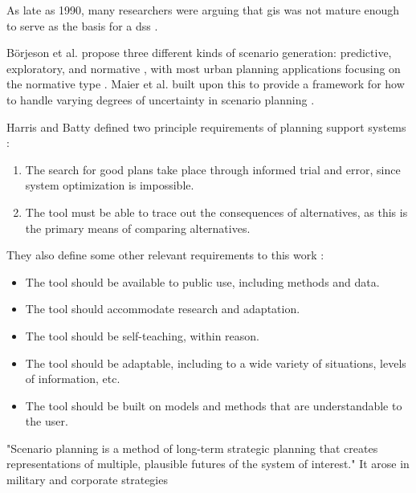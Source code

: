 As late as 1990, many researchers were arguing that \ac{gis} was not mature enough to serve as the basis for a \ac{dss} \cite{jankowskiIntegratingGeographicalInformation1995}.

Börjeson et al. propose three different kinds of scenario generation: predictive, exploratory, and normative \cite{borjesonScenarioTypesTechniques2006}, with most urban planning applications focusing on the normative type \cite{avinUsingExploratoryScenarios2020}. Maier et al. built upon this to provide a framework for how to handle varying degrees of uncertainty in scenario planning \cite{maierUncertainFutureDeep2016}. 


Harris and Batty defined two principle requirements of planning support systems \cite{harrisLocationalModelsGeographic1993}:
\begin{enumerate}[itemsep=0pt,parsep=0pt]
	\item{The search for good plans take place through informed trial and error, since system optimization is impossible.}
	\item{The tool must be able to trace out the consequences of alternatives, as this is the primary means of comparing alternatives.}
\end{enumerate}

They also define some other relevant requirements to this work \cite{harrisLocationalModelsGeographic1993}:
\begin{itemize}[itemsep=0pt,parsep=0pt]
	\item{The tool should be available to public use, including methods and data.}
	\item{The tool should accommodate research and adaptation.}
	\item{The tool should be self-teaching, within reason.}
	\item{The tool should be adaptable, including to a wide variety of situations, levels of information, etc.}
	\item{The tool should be built on models and methods that are understandable to the user.}
\end{itemize}


"Scenario planning is a method of long-term strategic planning that creates representations of multiple, plausible futures of the system of interest." It arose in military and corporate strategies \cite{goodspeedScenarioPlanningCities2020} 

